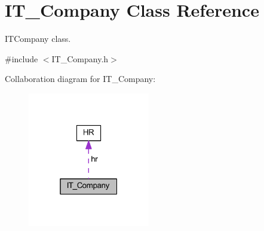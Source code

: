 \hypertarget{class_i_t___company}{}\section{I\+T\+\_\+\+Company Class Reference}
\label{class_i_t___company}


I\+T\+Company class.  




{\ttfamily \#include $<$I\+T\+\_\+\+Company.\+h$>$}



Collaboration diagram for I\+T\+\_\+\+Company\+:\nopagebreak
\begin{figure}[H]
\begin{center}
\leavevmode
\includegraphics[width=151pt]{class_i_t___company__coll__graph}
\end{center}
\end{figure}
